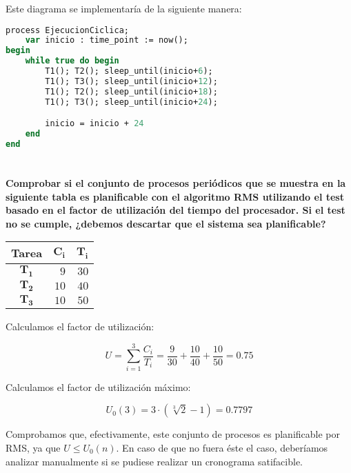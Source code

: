 Este diagrama se implementaría de la siguiente manera:

\begin{lstlisting}[language=Pascal]
process EjecucionCiclica;
	var inicio : time_point := now();
begin
	while true do begin
		T1(); T2(); sleep_until(inicio+6);
		T1(); T3(); sleep_until(inicio+12);
		T1(); T2(); sleep_until(inicio+18);
		T1(); T3(); sleep_until(inicio+24);

		inicio = inicio + 24
	end
end
\end{lstlisting}

\pagebreak

\section{}

\textbf{Comprobar si el conjunto de procesos periódicos que se muestra en la siguiente tabla es planificable con el algoritmo RMS utilizando el test basado en el factor de utilización del tiempo del procesador.
Si el test no se cumple, ¿debemos descartar que el sistema sea planificable?}

\begin{center}
	\begin{tabular}{|c|rr|}
		\hline
		\textbf{Tarea} & $\boldsymbol{C_i}$ & $\boldsymbol{T_i}$ \\
		\hline
		\hline
		$\boldsymbol{T_1}$ & $9$  & $30$ \\
		$\boldsymbol{T_2}$ & $10$ & $40$ \\
		$\boldsymbol{T_3}$ & $10$ & $50$ \\
		\hline
	\end{tabular}
\end{center}

Calculamos el factor de utilización:

\[U=\sum_{i=1}^{3}\frac{C_i}{T_i}=\frac{9}{30}+\frac{10}{40}+\frac{10}{50}=\boldsymbol{0.75}\]

Calculamos el factor de utilización máximo:

\[U_0(3)=3\cdot(\sqrt[3]{2}-1)=\boldsymbol{0.7797}\]

Comprobamos que, efectivamente, este conjunto de procesos es planificable por RMS, ya que $U\leq U_0(n)$.
En caso de que no fuera éste el caso, deberíamos analizar manualmente si se pudiese realizar un cronograma satifacible.

\section{}

